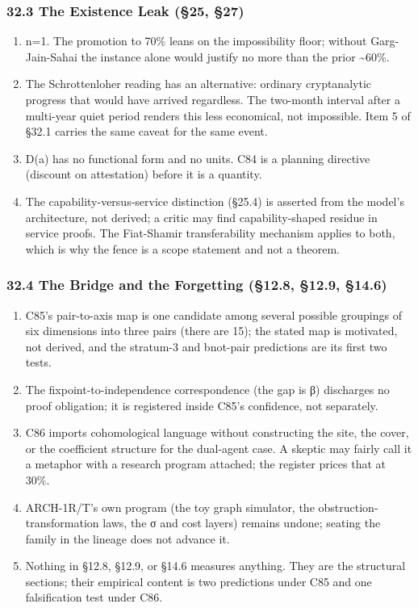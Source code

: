 \documentclass[
  11pt,
]{article}
\providecommand{\tightlist}{%
  \setlength{\itemsep}{0pt}\setlength{\parskip}{0pt}}
\begin{document}
\subsubsection{32.3 The Existence Leak (§25,
§27)}\label{the-existence-leak-25-27}

\begin{enumerate}
\def\labelenumi{\arabic{enumi}.}
\tightlist
\item
  n=1. The promotion to 70\% leans on the impossibility floor; without
  Garg-Jain-Sahai the instance alone would justify no more than the
  prior \textasciitilde60\%.
\item
  The Schrottenloher reading has an alternative: ordinary cryptanalytic
  progress that would have arrived regardless. The two-month interval
  after a multi-year quiet period renders this less economical, not
  impossible. Item 5 of §32.1 carries the same caveat for the same
  event.
\item
  D(a) has no functional form and no units. C84 is a planning directive
  (discount on attestation) before it is a quantity.
\item
  The capability-versus-service distinction (§25.4) is asserted from the
  model's architecture, not derived; a critic may find capability-shaped
  residue in service proofs. The Fiat-Shamir transferability mechanism
  applies to both, which is why the fence is a scope statement and not a
  theorem.
\end{enumerate}

\subsubsection{32.4 The Bridge and the Forgetting (§12.8, §12.9,
§14.6)}\label{the-bridge-and-the-forgetting-12.8-12.9-14.6}

\begin{enumerate}
\def\labelenumi{\arabic{enumi}.}
\tightlist
\item
  C85's pair-to-axis map is one candidate among several possible
  groupings of six dimensions into three pairs (there are 15); the
  stated map is motivated, not derived, and the stratum-3 and bnot-pair
  predictions are its first two tests.
\item
  The fixpoint-to-independence correspondence (the gap is β) discharges
  no proof obligation; it is registered inside C85's confidence, not
  separately.
\item
  C86 imports cohomological language without constructing the site, the
  cover, or the coefficient structure for the dual-agent case. A skeptic
  may fairly call it a metaphor with a research program attached; the
  register prices that at 30\%.
\item
  ARCH-1R/T's own program (the toy graph simulator, the
  obstruction-transformation laws, the σ and cost layers) remains
  undone; seating the family in the lineage does not advance it.
\item
  Nothing in §12.8, §12.9, or §14.6 measures anything. They are the
  structural sections; their empirical content is two predictions under
  C85 and one falsification test under C86.
\end{enumerate}
\end{document}
